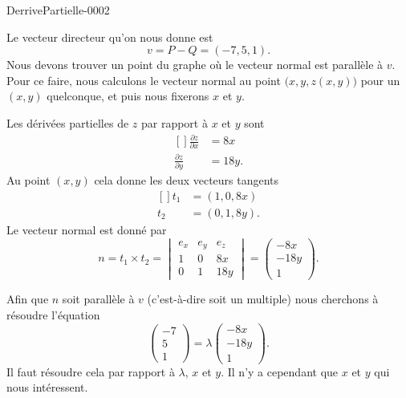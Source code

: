 
\begin{corrige}{DerrivePartielle-0002}

	Le vecteur directeur qu'on nous donne est 
	\begin{equation}
		v=P-Q=(-7,5,1).
	\end{equation}
	Nous devons trouver un point du graphe où le vecteur normal est parallèle à $v$. Pour ce faire, nous calculons le vecteur normal au point $\big( x,y,z(x,y) \big)$ pour un $(x,y)$ quelconque, et puis nous fixerons $x$ et $y$.

	Les dérivées partielles de $z$ par rapport à $x$ et $y$ sont
	\begin{equation}
		\begin{aligned}[]
			\frac{ \partial z }{ \partial x }&=8x\\
			\frac{ \partial z }{ \partial y }&=18y.
		\end{aligned}
	\end{equation}
	Au point $(x,y)$ cela donne les deux vecteurs tangents 
	\begin{equation}
		\begin{aligned}[]
			t_1&=(1,0,8x)\\
			t_2&=(0,1,8y).
		\end{aligned}
	\end{equation}
	Le vecteur normal est donné par
	\begin{equation}
		n=t_1\times t_2=\begin{vmatrix}
			e_x	&	e_y	&	e_z	\\
			1	&	0	&	8x	\\
			0	&	1	&	18y
		\end{vmatrix}=\begin{pmatrix}
			-8x	\\ 
			-18y	\\ 
			1	
		\end{pmatrix}.
	\end{equation}
	
	Afin que $n$ soit parallèle à $v$ (c'est-à-dire soit un multiple) nous cherchons à résoudre l'équation
	\begin{equation}
		\begin{pmatrix}
			-7	\\ 
			5	\\ 
			1	
		\end{pmatrix}=\lambda
		\begin{pmatrix}
			-8x	\\ 
			-18y	\\ 
			1	
		\end{pmatrix}.
	\end{equation}
	Il faut résoudre cela par rapport à $\lambda$, $x$ et $y$. Il n'y a cependant que $x$ et $y$ qui nous intéressent.


\end{corrige}
